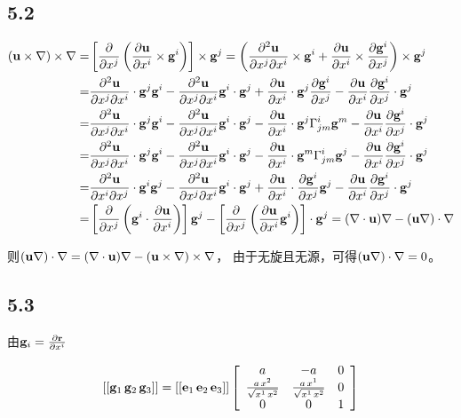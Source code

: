 \documentclass[UTF8,zihao=5]{ctexart}
\newcommand{\bm}[1]{{\mathbf{#1}}}
\newcommand*{\pd}[2]{\frac{\partial #1}{\partial #2}}
\newcommand*{\pdcd}[3]
{\frac{\partial^2 #1}{\partial #2 \partial #3}}
\begin{document}
\subsection*{5.2}


$$
    \begin{aligned}
        (\uu\times\nb)\times\nb
        = &
        \left[\pd{}{x^j}\left(
            \pd{\uu}{x^i}\times\g^i
            \right)\right]\times\g^j
        =
        \left(
        \pdcd{\uu}{x^j}{x^i}\times\g^i
        +\pd{\uu}{x^i}\times\pd{\g^i}{x^j}
        \right)\times\g^j                     \\
        = &
        \pdcd{\uu}{x^j}{x^i}\cdot\g^j\g^i
        -\pdcd{\uu}{x^j}{x^i}\g^i\cdot\g^j
        +\pd{\uu}{x^i}\cdot\g^j\pd{\g^i}{x^j}
        -\pd{\uu}{x^i}\pd{\g^i}{x^j}\cdot\g^j \\
        = &
        \pdcd{\uu}{x^j}{x^i}\cdot\g^j\g^i
        -\pdcd{\uu}{x^j}{x^i}\g^i\cdot\g^j
        -\pd{\uu}{x^i}\cdot\g^j\Gamma^i_{jm}\g^m
        -\pd{\uu}{x^i}\pd{\g^i}{x^j}\cdot\g^j \\
        = &
        \pdcd{\uu}{x^j}{x^i}\cdot\g^j\g^i
        -\pdcd{\uu}{x^j}{x^i}\g^i\cdot\g^j
        -\pd{\uu}{x^i}\cdot\g^m\Gamma^i_{jm}\g^j
        -\pd{\uu}{x^i}\pd{\g^i}{x^j}\cdot\g^j \\
        = &
        \pdcd{\uu}{x^i}{x^j}\cdot\g^i\g^j
        -\pdcd{\uu}{x^j}{x^i}\g^i\cdot\g^j
        +\pd{\uu}{x^i}\cdot\pd{\g^i}{x^j}\g^j
        -\pd{\uu}{x^i}\pd{\g^i}{x^j}\cdot\g^j \\
        = &
        \left[\pd{}{x^j}\left(\g^i\cdot\pd{\uu}{x^i}\right)\right]\g^j
        -
        \left[\pd{}{x^j}\left(\pd{\uu}{x^i}\g^i\right)\right]\cdot\g^j
        =
        (\nb\cdot\uu)\nb - (\uu\nb)\cdot\nb
    \end{aligned}
$$

则$(\uu\nb)\cdot\nb=(\nb\cdot\uu)\nb-(\uu\times\nb)\times\nb$，
由于无旋且无源，可得$(\uu\nb)\cdot\nb=0$。

\subsection*{5.3}

由$\g_i=\pd{\bm{r}}{x^i}$

$$
    [[\g_1\,\g_2\,\g_3]]=
    [[\bm{e}_1\,\bm{e}_2\,\bm{e}_3]]
    \left[\begin{array}{ccc} a & -a & 0\\ \frac{a\,x^{2}}{\sqrt{x^{1}\,x^{2}}} & \frac{a\,x^{1}}{\sqrt{x^{1}\,x^{2}}} & 0\\ 0 & 0 & 1 \end{array}\right]
$$
\end{document}

